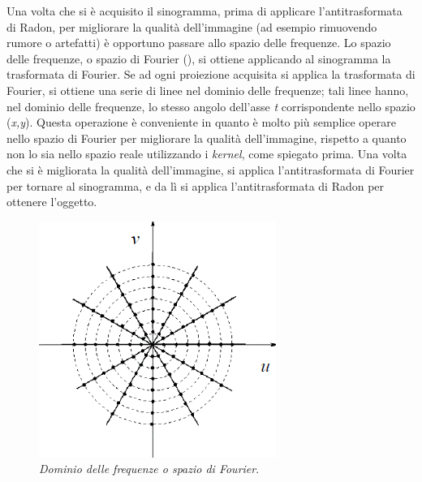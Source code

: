Una volta che si è acquisito il sinogramma, prima di applicare l'antitrasformata di Radon, per migliorare la qualità dell'immagine (ad esempio rimuovendo rumore o artefatti) è opportuno passare allo spazio delle frequenze. Lo spazio delle frequenze, o spazio di Fourier (), si ottiene applicando al sinogramma la trasformata di Fourier. Se ad ogni proiezione acquisita si applica la trasformata di Fourier, si ottiene una serie di linee nel dominio delle frequenze; tali linee hanno, nel dominio delle frequenze, lo stesso angolo dell'asse \textit{t} corrispondente nello spazio (\textit{x,y}). Questa operazione è conveniente in quanto è molto più semplice operare nello spazio di Fourier per migliorare la qualità dell'immagine, rispetto a quanto non lo sia nello spazio reale utilizzando i \textit{kernel}, come spiegato prima. Una volta che si è migliorata la qualità dell'immagine, si applica l'antitrasformata di Fourier per tornare al sinogramma, e da lì si applica l'antitrasformata di Radon per ottenere l'oggetto.

\begin{figure}[htp]
\centering
\includegraphics[scale=0.84]{Immagini/frequenze.png}
\caption{\label{fig:frequenze} \textit{Dominio delle frequenze o spazio di Fourier}.}
\end{figure}


